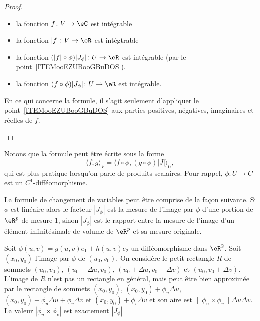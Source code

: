 \begin{proof}
\begin{enumerate}
            \begin{itemize}
                \item la fonction \( f\colon V\to \eC\) est intégrable
                \item la fonction \( | f |\colon V\to \eR\) est intégtrable
                \item la fonction \( (| f |\circ\phi)| J_{\phi} |\colon U\to \eR\) est intégrable (par le point~\ref{ITEMooEZUBooGBuDOS}).
                \item la fonction \( (f\circ\phi)| J_{\phi} |\colon U\to \eR\) est intégrable.
            \end{itemize}
            En ce qui concerne la formule, il s'agit seulement d'appliquer le point~\ref{ITEMooEZUBooGBuDOS} aux parties positives, négatives, imaginaires et réelles de \( f\).
    \end{enumerate}
\end{proof}

Notons que la formule peut être écrite sous la forme
\begin{equation}        \label{EQooQKARooELPCFO}
    \langle f, g\rangle_V=\langle f\circ\phi, (g\circ\phi)| J |\rangle_U,
\end{equation}
qui est plus pratique lorsqu'on parle de produits scalaires. Pour rappel, \( \phi\colon U\to C\) est un \( C^1\)-difféomorphisme.

\begin{normaltext}
La formule de changement de variables peut être comprise de la façon suivante. Si $\phi$ est linéaire  alors le facteur $|J_{\phi}|$ est la mesure de l'image par $\phi$ d'une portion de $\eR^p$ de mesure $1$, sinon  $|J_{\phi}|$ est le rapport entre la mesure de l'image d'un élément infinitésimale de volume de $\eR^p$ et sa mesure originale.

Soit $\phi(u,v)=g(u,v)e_1+h(u,v)e_2$ un difféomorphisme dans $\eR^2$. Soit $(x_0, y_0)$ l'image par $\phi$ de $(u_0,v_0)$. On considère le petit rectangle $R$ de sommets $(u_0,v_0)$, $(u_0+\Delta u,v_0)$, $(u_0+\Delta u,v_0+\Delta v)$ et $(u_0,v_0+\Delta v)$. L'image de $R$ n'est pas un rectangle en général, mais peut être bien approximée par le rectangle de sommets $(x_0,y_0)$, $(x_0 ,y_0)+ \phi_{u}\Delta u$, $(x_0 ,y_0)+\phi_{u}\Delta u +\phi_{v}\Delta v$ et  $(x_0 ,y_0)+ \phi_{v}\Delta v$ et son aire est $\| \phi_{u}\times \phi_{v}\| \Delta u\Delta v$. La valeur $|\phi_{u}\times \phi_{v}|$ est exactement $|J_{\phi}|$
\end{normaltext}

